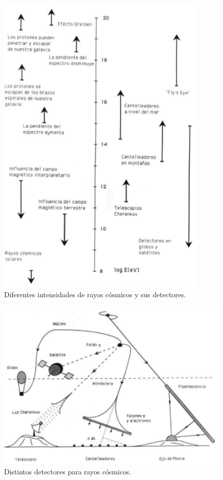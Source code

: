 \documentclass[a4paper,10pt]{article}
\numberwithin{equation}{section}
\begin{document}
\begin{figure}[H]
 \center 
 \includegraphics[scale=0.98]{fig4}
 \caption{Diferentes intensidades de rayos cósmicos y sus detectores.}
 \label{fig:fig4}
\end{figure}

\begin{figure}[H]
 \center 
 \includegraphics[scale=0.8]{fig5}
 \caption{Distintos detectores para rayos cósmicos.}
 \label{fig:fig5}
\end{figure}
\end{document}
